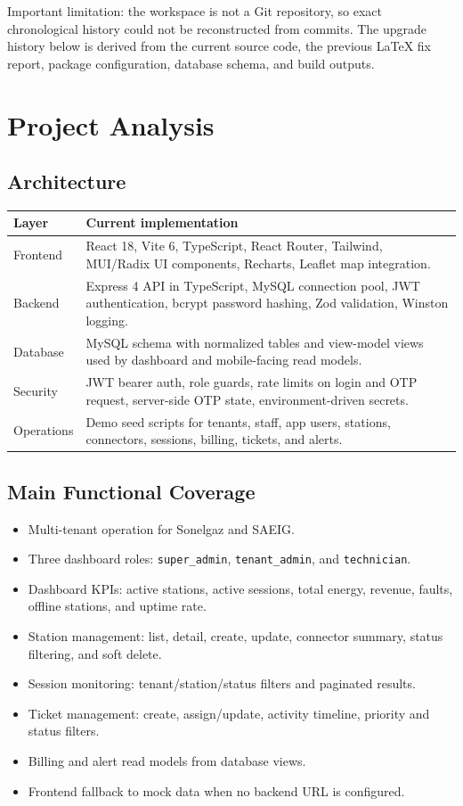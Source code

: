 \documentclass[12pt,a4paper]{report}
\begin{document}
Important limitation: the workspace is not a Git repository, so exact chronological history could not be reconstructed from commits. The upgrade history below is derived from the current source code, the previous LaTeX fix report, package configuration, database schema, and build outputs.

\chapter{Project Analysis}

\section{Architecture}

\begin{tabularx}{\linewidth}{p{3.4cm}Y}
\toprule
Layer & Current implementation \\
\midrule
Frontend & React 18, Vite 6, TypeScript, React Router, Tailwind, MUI/Radix UI components, Recharts, Leaflet map integration. \\
Backend & Express 4 API in TypeScript, MySQL connection pool, JWT authentication, bcrypt password hashing, Zod validation, Winston logging. \\
Database & MySQL schema with normalized tables and view-model views used by dashboard and mobile-facing read models. \\
Security & JWT bearer auth, role guards, rate limits on login and OTP request, server-side OTP state, environment-driven secrets. \\
Operations & Demo seed scripts for tenants, staff, app users, stations, connectors, sessions, billing, tickets, and alerts. \\
\bottomrule
\end{tabularx}

\section{Main Functional Coverage}

\begin{itemize}
  \item Multi-tenant operation for Sonelgaz and SAEIG.
  \item Three dashboard roles: \texttt{super\_admin}, \texttt{tenant\_admin}, and \texttt{technician}.
  \item Dashboard KPIs: active stations, active sessions, total energy, revenue, faults, offline stations, and uptime rate.
  \item Station management: list, detail, create, update, connector summary, status filtering, and soft delete.
  \item Session monitoring: tenant/station/status filters and paginated results.
  \item Ticket management: create, assign/update, activity timeline, priority and status filters.
  \item Billing and alert read models from database views.
  \item Frontend fallback to mock data when no backend URL is configured.
\end{itemize}
\end{document}

